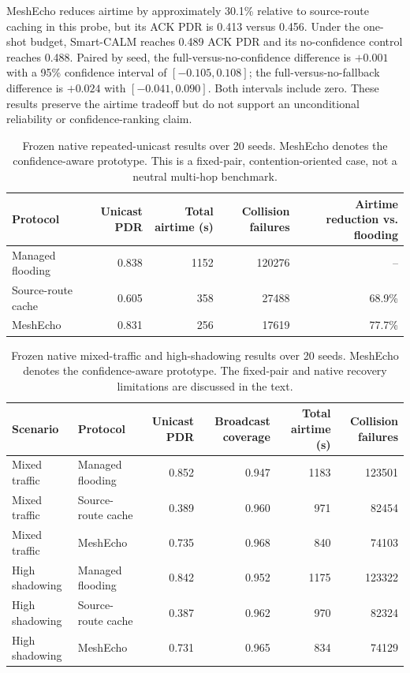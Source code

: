 \documentclass[conference]{IEEEtran}
\begin{document}
MeshEcho reduces airtime by approximately 30.1\% relative to source-route
caching in this probe, but its ACK PDR is 0.413 versus 0.456. Under the
one-shot budget, Smart-CALM reaches 0.489 ACK PDR and its no-confidence control
reaches 0.488. Paired by seed, the full-versus-no-confidence difference is
$+0.001$ with a 95\% confidence interval of $[-0.105,0.108]$; the
full-versus-no-fallback difference is $+0.024$ with
$[-0.041,0.090]$. Both intervals include zero. These results preserve the
airtime tradeoff but do not support an unconditional reliability or
confidence-ranking claim.

\begin{table}[t]
\centering
\caption{Frozen native repeated-unicast results over 20 seeds. MeshEcho denotes
the confidence-aware prototype. This is a fixed-pair, contention-oriented
case, not a neutral multi-hop benchmark.}
\label{tab:unicast}
\begin{tabular}{lrrrr}
\toprule
Protocol & Unicast PDR & Total airtime (s) & Collision failures & Airtime reduction vs. flooding \\
\midrule
Managed flooding & 0.838 & 1152 & 120276 & -- \\
Source-route cache & 0.605 & 358 & 27488 & 68.9\% \\
MeshEcho & 0.831 & 256 & 17619 & 77.7\% \\
\bottomrule
\end{tabular}
\end{table}

\begin{table}[t]
\centering
\caption{Frozen native mixed-traffic and high-shadowing results over 20 seeds.
MeshEcho denotes the confidence-aware prototype. The fixed-pair and native
recovery limitations are discussed in the text.}
\label{tab:mixed}
\begin{tabular}{llrrrr}
\toprule
Scenario & Protocol & Unicast PDR & Broadcast coverage & Total airtime (s) & Collision failures \\
\midrule
Mixed traffic & Managed flooding & 0.852 & 0.947 & 1183 & 123501 \\
Mixed traffic & Source-route cache & 0.389 & 0.960 & 971 & 82454 \\
Mixed traffic & MeshEcho & 0.735 & 0.968 & 840 & 74103 \\
\midrule
High shadowing & Managed flooding & 0.842 & 0.952 & 1175 & 123322 \\
High shadowing & Source-route cache & 0.387 & 0.962 & 970 & 82324 \\
High shadowing & MeshEcho & 0.731 & 0.965 & 834 & 74129 \\
\bottomrule
\end{tabular}
\end{table}
\end{document}
